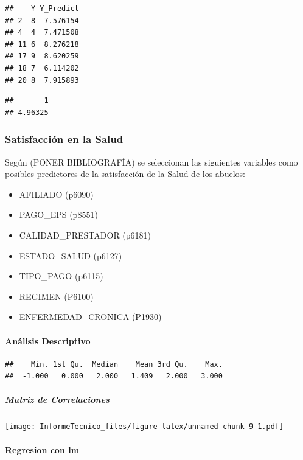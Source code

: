 \documentclass[
]{article}
\providecommand{\tightlist}{%
  \setlength{\itemsep}{0pt}\setlength{\parskip}{0pt}}
\begin{document}
\begin{verbatim}
##    Y Y_Predict
## 2  8  7.576154
## 4  4  7.471508
## 11 6  8.276218
## 17 9  8.620259
## 18 7  6.114202
## 20 8  7.915893
\end{verbatim}

\begin{verbatim}
##       1 
## 4.96325
\end{verbatim}

\hypertarget{satisfacciuxf3n-en-la-salud}{%
\subsubsection{Satisfacción en la
Salud}\label{satisfacciuxf3n-en-la-salud}}

Según (PONER BIBLIOGRAFÍA) se seleccionan las siguientes variables como
posibles predictores de la satisfacción de la Salud de los abuelos:

\begin{itemize}
\tightlist
\item
  AFILIADO (p6090)
\item
  PAGO\_EPS (p8551)
\item
  CALIDAD\_PRESTADOR (p6181)
\item
  ESTADO\_SALUD (p6127)
\item
  TIPO\_PAGO (p6115)
\item
  REGIMEN (P6100)
\item
  ENFERMEDAD\_CRONICA (P1930)
\end{itemize}

\hypertarget{anuxe1lisis-descriptivo-1}{%
\paragraph{Análisis Descriptivo}\label{anuxe1lisis-descriptivo-1}}

\begin{verbatim}
##    Min. 1st Qu.  Median    Mean 3rd Qu.    Max. 
##  -1.000   0.000   2.000   1.409   2.000   3.000
\end{verbatim}

\hypertarget{matriz-de-correlaciones-1}{%
\subparagraph{Matriz de Correlaciones}\label{matriz-de-correlaciones-1}}

\texttt{[image: InformeTecnico\_files/figure-latex/unnamed-chunk-9-1.pdf]}

\hypertarget{regresion-con-lm}{%
\paragraph{Regresion con lm}\label{regresion-con-lm}}
\end{document}
